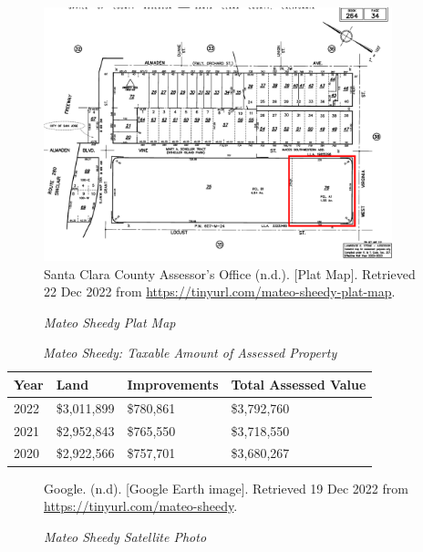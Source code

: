 \begin{figure}[hbtp]
    \caption[Mateo Sheedy Plat Map]{\textit{Mateo Sheedy Plat Map}}\label{fig:mateo-sheedy-plat-map}\indent
    \includegraphics[width=0.9\textwidth]{Assessor-Info/mateo-sheedy-plat-map-264-34}\\ %
    \footnotesize{Santa Clara County Assessor's Office (n.d.). [Plat Map]. Retrieved 22 Dec 2022 from  \url{https://tinyurl.com/mateo-sheedy-plat-map}}.
\end{figure}

\begin{table}[hbtp]
  \SingleSpacing%
  \caption[Mateo Sheedy: Taxable Amount of Assessed Propery]{\textit{Mateo Sheedy: Taxable Amount of Assessed Property}}\label{tab:mateo-sheedy-taxable-amount}
  \begin{tabular}{llll}
    \toprule
    Year & Land        & Improvements & Total Assessed Value \\
    \midrule
    2022 & \$3,011,899 & \$780,861    & \$3,792,760 \\
    2021 & \$2,952,843 & \$765,550    & \$3,718,550 \\
    2020 & \$2,922,566 & \$757,701    & \$3,680,267 \\
    \bottomrule
  \end{tabular}
\end{table}

\begin{figure}[hbtp]
  \caption[Mateo Sheedy Satellite Photo]{\textit{Mateo Sheedy Satellite Photo}}
  \label{fig:mateo-sheedy-sat-photo}\centering
    {Google. (n.d). [Google Earth image]. Retrieved 19 Dec 2022 from \url{https://tinyurl.com/mateo-sheedy}.}
\end{figure}

